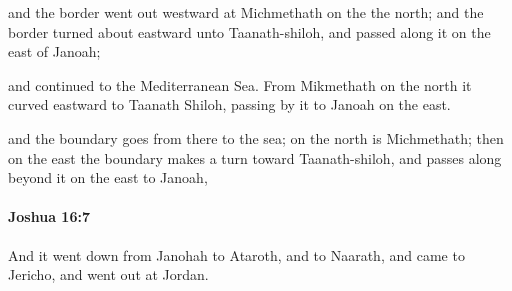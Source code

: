 			\begin{versebox}
					\item[BHS] 
					\item[ASV] and the border went out westward at Michmethath on the the north; and the border turned about eastward unto Taanath-shiloh, and passed along it on the east of Janoah;
					\item[NIV] and continued to the Mediterranean Sea. From Mikmethath on the north it curved eastward to Taanath Shiloh, passing by it to Janoah on the east.
					\item[NRSV] and the boundary goes from there to the sea; on the north is Michmethath; then on the east the boundary makes a turn toward Taanath-shiloh, and passes along beyond it on the east to Janoah,
			\end{versebox}

		\paragraph{Joshua 16:7} %
			\label{JOSHUA-16-7}

			And it went down from Janohah to Ataroth, and to Naarath, and came to Jericho, and went out at Jordan.

